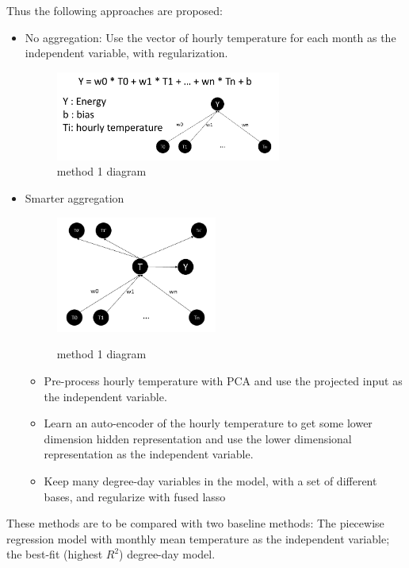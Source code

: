 \documentclass[12pt]{article}
\begin{document}
Thus the following approaches are proposed:
\begin{itemize}
\item No aggregation: Use the vector of hourly temperature for each
  month as the independent variable, with regularization.
\begin{figure}[h!]
  \centering
  \includegraphics[width=0.7\textwidth]{images/Slide16.PNG}
  \caption{method 1 diagram}
\end{figure}
\item Smarter aggregation
\begin{figure}[h!]
  \centering
  \includegraphics[width=0.5\textwidth]{images/Slide17.PNG}
  \label{fig:pcafig}
  \caption{method 1 diagram}
\end{figure}
\FloatBarrier
    \begin{itemize}
    \item Pre-process hourly temperature with PCA
    and use the projected input as the independent variable.
  \item Learn an auto-encoder of the hourly temperature to get some
    lower dimension hidden representation and use the lower
    dimensional representation as the independent variable.
  \item Keep many degree-day variables in the model, with a set of
    different bases, and regularize with fused
    lasso~\cite{tibshirani2005sparsity}
    \end{itemize}
\end{itemize}
These methods are to be compared with two baseline methods: The
piecewise regression model with monthly mean temperature as the
independent variable; the best-fit (highest $R^2$) degree-day model.
\end{document}
